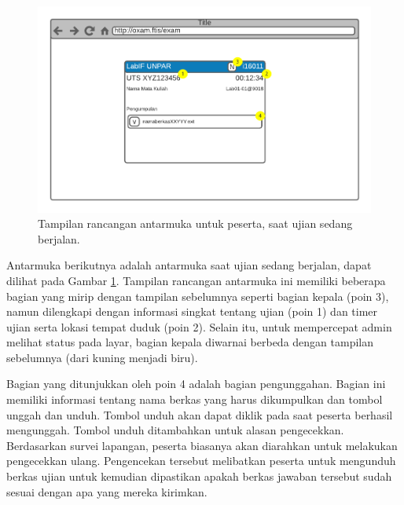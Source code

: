     \begin{figure}
        \centering
        \includegraphics[width=0.7\paperwidth]{Gambar/mockups/Mockup--Peserta - Startstate.pdf}
        \caption{Tampilan rancangan antarmuka untuk peserta, saat ujian sedang berjalan.}
        \label{fig:mockup_peserta_activestate}
    \end{figure}
    Antarmuka berikutnya adalah antarmuka saat ujian sedang berjalan, dapat
    dilihat pada Gambar \ref{fig:mockup_peserta_activestate}. Tampilan rancangan
    antarmuka ini memiliki beberapa bagian yang mirip dengan tampilan sebelumnya
    seperti bagian kepala (poin 3), namun dilengkapi dengan informasi singkat
    tentang ujian (poin 1) dan timer ujian serta lokasi tempat duduk (poin 2).
    Selain itu, untuk mempercepat admin melihat status pada layar, bagian kepala
    diwarnai berbeda dengan tampilan sebelumnya (dari kuning menjadi biru).
    
    Bagian yang ditunjukkan oleh poin 4 adalah bagian pengunggahan. Bagian ini
    memiliki informasi tentang nama berkas yang harus dikumpulkan dan tombol
    unggah dan unduh. Tombol unduh akan dapat diklik pada saat peserta berhasil
    mengunggah. Tombol unduh ditambahkan untuk alasan pengecekkan. Berdasarkan
    survei lapangan, peserta biasanya akan diarahkan untuk melakukan pengecekkan
    ulang. Pengencekan tersebut melibatkan peserta untuk mengunduh berkas ujian
    untuk kemudian dipastikan apakah berkas jawaban tersebut sudah sesuai dengan
    apa yang mereka kirimkan.
    
